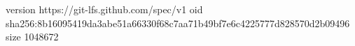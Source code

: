 version https://git-lfs.github.com/spec/v1
oid sha256:8b16095419da3abe51a66330f68c7aa71b49bf7e6c4225777d828570d2b09496
size 1048672
